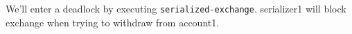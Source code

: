 \documentclass[a4paper,12pt]{article}
\begin{document}
We'll enter a deadlock by executing \lstinline!serialized-exchange!.
serializer1 will block exchange when trying to withdraw from account1.
\end{document}
